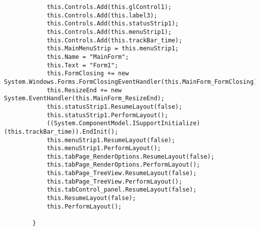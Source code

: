 \begin{scriptsize}
\begin{verbatim}
            this.Controls.Add(this.glControl1);
            this.Controls.Add(this.label3);
            this.Controls.Add(this.statusStrip1);
            this.Controls.Add(this.menuStrip1);
            this.Controls.Add(this.trackBar_time);
            this.MainMenuStrip = this.menuStrip1;
            this.Name = "MainForm";
            this.Text = "Form1";
            this.FormClosing += new System.Windows.Forms.FormClosingEventHandler(this.MainForm_FormClosing);
            this.ResizeEnd += new System.EventHandler(this.MainForm_ResizeEnd);
            this.statusStrip1.ResumeLayout(false);
            this.statusStrip1.PerformLayout();
            ((System.ComponentModel.ISupportInitialize)(this.trackBar_time)).EndInit();
            this.menuStrip1.ResumeLayout(false);
            this.menuStrip1.PerformLayout();
            this.tabPage_RenderOptions.ResumeLayout(false);
            this.tabPage_RenderOptions.PerformLayout();
            this.tabPage_TreeView.ResumeLayout(false);
            this.tabPage_TreeView.PerformLayout();
            this.tabControl_panel.ResumeLayout(false);
            this.ResumeLayout(false);
            this.PerformLayout();

        }


\end{verbatim}
\end{scriptsize}
